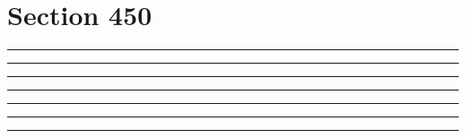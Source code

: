\documentclass[11pt,a4paper]{article}
\begin{document}
\section{Section 450}
\begin{swarmwrap}%
  \begin{minipage}[t]{4cm}
    \centering
    \textcolor{red!20}{\rule{\linewidth}{2cm}}
  \end{minipage}%
\end{swarmwrap}%
\swarmwrapnext\lipsum[1]
\begin{swarmwrap}%
  \begin{minipage}[t]{5cm}
    \centering
    \textcolor{red!20}{\rule{\linewidth}{3cm}}
  \end{minipage}%
\end{swarmwrap}%
\swarmwrapnext\lipsum[1]\lipsum[2]
\begin{swarmwrap}%
  \begin{minipage}[t]{2cm}
    \centering
    \textcolor{red!20}{\rule{\linewidth}{4cm}}
  \end{minipage}%
\end{swarmwrap}%
\swarmwrapnext\lipsum[1]\lipsum[2]\lipsum[3]
\begin{swarmwrap}%
  \begin{minipage}[t]{3cm}
    \centering
    \textcolor{red!20}{\rule{\linewidth}{5cm}}
  \end{minipage}%
\end{swarmwrap}%
\swarmwrapnext\lipsum[1]\lipsum[2]\lipsum[3]\lipsum[4]
\begin{swarmwrap}%
  \begin{minipage}[t]{4cm}
    \centering
    \textcolor{red!20}{\rule{\linewidth}{6cm}}
  \end{minipage}%
\end{swarmwrap}%
\swarmwrapnext\lipsum[1]\lipsum[2]\lipsum[3]\lipsum[4]\lipsum[5]
\begin{swarmwrap}%
  \begin{minipage}[t]{5cm}
    \centering
    \textcolor{red!20}{\rule{\linewidth}{7cm}}
  \end{minipage}%
\end{swarmwrap}%
\swarmwrapnext\lipsum[1]\lipsum[2]\lipsum[3]\lipsum[4]\lipsum[5]\lipsum[6]
\begin{swarmwrap}%
  \begin{minipage}[t]{2cm}
    \centering
    \textcolor{red!20}{\rule{\linewidth}{8cm}}
  \end{minipage}%
\end{swarmwrap}%
\end{document}

